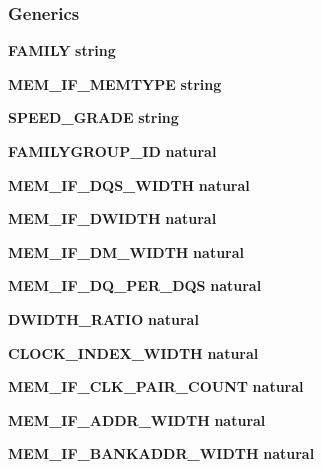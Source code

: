 \subsubsection*{Generics}
 \begin{DoxyCompactItemize}
\item 
{\bf F\+A\+M\+I\+LY} {\bfseries {\bfseries \textcolor{comment}{string}\textcolor{vhdlchar}{ }}}
\item 
{\bf M\+E\+M\+\_\+\+I\+F\+\_\+\+M\+E\+M\+T\+Y\+PE} {\bfseries {\bfseries \textcolor{comment}{string}\textcolor{vhdlchar}{ }}}
\item 
{\bf S\+P\+E\+E\+D\+\_\+\+G\+R\+A\+DE} {\bfseries {\bfseries \textcolor{comment}{string}\textcolor{vhdlchar}{ }}}
\item 
{\bf F\+A\+M\+I\+L\+Y\+G\+R\+O\+U\+P\+\_\+\+ID} {\bfseries {\bfseries \textcolor{comment}{natural}\textcolor{vhdlchar}{ }}}
\item 
{\bf M\+E\+M\+\_\+\+I\+F\+\_\+\+D\+Q\+S\+\_\+\+W\+I\+D\+TH} {\bfseries {\bfseries \textcolor{comment}{natural}\textcolor{vhdlchar}{ }}}
\item 
{\bf M\+E\+M\+\_\+\+I\+F\+\_\+\+D\+W\+I\+D\+TH} {\bfseries {\bfseries \textcolor{comment}{natural}\textcolor{vhdlchar}{ }}}
\item 
{\bf M\+E\+M\+\_\+\+I\+F\+\_\+\+D\+M\+\_\+\+W\+I\+D\+TH} {\bfseries {\bfseries \textcolor{comment}{natural}\textcolor{vhdlchar}{ }}}
\item 
{\bf M\+E\+M\+\_\+\+I\+F\+\_\+\+D\+Q\+\_\+\+P\+E\+R\+\_\+\+D\+QS} {\bfseries {\bfseries \textcolor{comment}{natural}\textcolor{vhdlchar}{ }}}
\item 
{\bf D\+W\+I\+D\+T\+H\+\_\+\+R\+A\+T\+IO} {\bfseries {\bfseries \textcolor{comment}{natural}\textcolor{vhdlchar}{ }}}
\item 
{\bf C\+L\+O\+C\+K\+\_\+\+I\+N\+D\+E\+X\+\_\+\+W\+I\+D\+TH} {\bfseries {\bfseries \textcolor{comment}{natural}\textcolor{vhdlchar}{ }}}
\item 
{\bf M\+E\+M\+\_\+\+I\+F\+\_\+\+C\+L\+K\+\_\+\+P\+A\+I\+R\+\_\+\+C\+O\+U\+NT} {\bfseries {\bfseries \textcolor{comment}{natural}\textcolor{vhdlchar}{ }}}
\item 
{\bf M\+E\+M\+\_\+\+I\+F\+\_\+\+A\+D\+D\+R\+\_\+\+W\+I\+D\+TH} {\bfseries {\bfseries \textcolor{comment}{natural}\textcolor{vhdlchar}{ }}}
\item 
{\bf M\+E\+M\+\_\+\+I\+F\+\_\+\+B\+A\+N\+K\+A\+D\+D\+R\+\_\+\+W\+I\+D\+TH} {\bfseries {\bfseries \textcolor{comment}{natural}\textcolor{vhdlchar}{ }}}
\item 

\end{DoxyCompactItemize}
